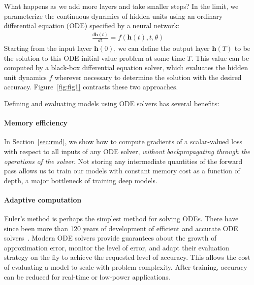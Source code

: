 \documentclass{article}
\newcommand{\vh}{\mathbf{h}}
\newcommand{\hidden}{\vh}
\begin{document}
What happens as we add more layers and take smaller steps?
In the limit, we parameterize the continuous dynamics of hidden units using an ordinary differential equation (ODE) specified by a neural network:
\begin{align}\label{eq:ivp}
\frac{d\hidden(t)}{dt} = f(\hidden(t), t, \theta) %
\end{align}
Starting from the input layer $\hidden(0)$, we can define the output layer $\hidden(T)$ to be the solution to this ODE initial value problem at some time $T$.
This value can be computed by a black-box differential equation solver, which evaluates the hidden unit dynamics $f$ wherever necessary to determine the solution with the desired accuracy.
Figure~\ref{fig:fig1} contrasts these two approaches.

Defining and evaluating models using ODE solvers has several benefits:

\paragraph{Memory efficiency}
In Section~\ref{sec:rmd}, we show how to compute gradients of a scalar-valued loss with respect to all inputs of any ODE solver, \emph{without backpropagating through the operations of the solver}.
Not storing any intermediate quantities of the forward pass allows us to train our models with constant memory cost as a function of depth, a major bottleneck of training deep models.


\paragraph{Adaptive computation}
Euler's method is perhaps the simplest method for solving ODEs.
There have since been more than 120 years of development of efficient and accurate ODE solvers~\citep{Runge, Kutta, hairer87:_solvin_ordin_differ_equat_i}.
Modern ODE solvers provide guarantees about the growth of approximation error, monitor the level of error, and adapt their evaluation strategy on the fly to achieve the requested level of accuracy.
This allows the cost of evaluating a model to scale with problem complexity.
After training, accuracy can be reduced for real-time or low-power applications.



\end{document}
